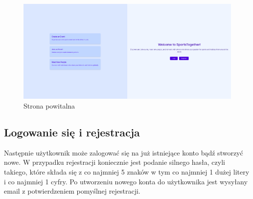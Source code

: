 \documentclass[11pt,a4paper]{article}
\begin{document}
\begin{figure} [H]
    \centering
    \includegraphics[width=1\linewidth]{pages/welcome.png}
    \caption{Strona powitalna}
\end{figure}

\subsection{Logowanie się i rejestracja}

Następnie użytkownik może zalogować się na już istniejące konto bądź stworzyć nowe. W przypadku rejestracji koniecznie jest podanie silnego hasła, czyli takiego, które składa się z co najmniej 5 znaków w tym co najmniej 1 dużej litery i co najmniej 1 cyfry. Po utworzeniu nowego konta do użytkownika jest wysyłany email z potwierdzeniem pomyślnej rejestracji.
\end{document}
